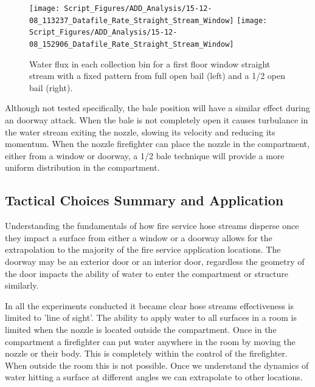 \documentclass[12pt,oneside]{book}
\begin{document}
\begin{figure}[ht]
\texttt{[image: Script\_Figures/ADD\_Analysis/15-12-08\_113237\_Datafile\_Rate\_Straight\_Stream\_Window]}
\texttt{[image: Script\_Figures/ADD\_Analysis/15-12-08\_152906\_Datafile\_Rate\_Straight\_Stream\_Window]} \\ 
\caption[Water Flux Varying Bale Opening Straight Stream]{Water flux in each collection bin for a first floor window straight stream with a fixed pattern from full open bail (left) and a 1/2 open bail (right).}
\label{fig:SS_Window_First_Floor_Varying_Bail}
\end{figure}

Although not tested specifically, the bale position will have a similar effect during an doorway attack. When the bale is not completely open it causes turbulance in the water stream exiting the nozzle, slowing its velocity and reducing its momentum. When the nozzle firefighter can place the nozzle in the compartment, either from a window or doorway, a 1/2 bale technique will provide a more uniform distribution in the compartment. 

\clearpage

\subsection{Tactical Choices Summary and Application}

Understanding the fundamentals of how fire service hose streams disperse once they impact a surface from either a window or a doorway allows for the extrapolation to the majority of the fire service application locations. The doorway may be an exterior door or an interior door, regardless the geometry of the door impacts the ability of water to enter the compartment or structure similarly. 

In all the experiments conducted it became clear hose streams effectiveness is limited to 'line of sight'. The ability to apply water to all surfaces in a room is limited when the nozzle is located outside the compartment. Once in the compartment a firefighter can put water anywhere in the room by moving the nozzle or their body.  This is completely within the control of the firefighter.  When outside the room this is not possible.  Once we understand the dynamics of water hitting a surface at different angles we can extrapolate to other locations.  
\end{document}
